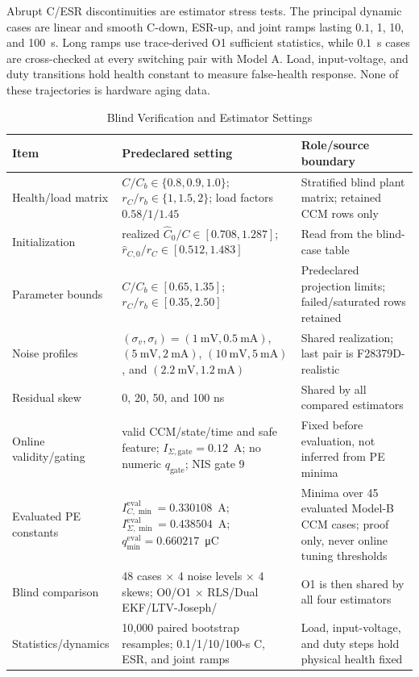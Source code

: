 Abrupt C/ESR discontinuities are estimator stress tests. The principal dynamic cases are linear and smooth C-down, ESR-up, and joint ramps lasting $0.1$, 1, 10, and 100~s. Long ramps use trace-derived O1 sufficient statistics, while $0.1$~s cases are cross-checked at every switching pair with Model A. Load, input-voltage, and duty transitions hold health constant to measure false-health response. None of these trajectories is hardware aging data.

\begin{table}[t]
\caption{Blind Verification and Estimator Settings}
\label{tab:verification_settings}
\centering
\footnotesize
\setlength{\tabcolsep}{4pt}
\begin{tabular}{p{3.0cm}p{6.0cm}p{6.6cm}}
\toprule
Item & Predeclared setting & Role/source boundary \\
\midrule
Health/load matrix & $C/C_b\in\{0.8,0.9,1.0\}$; $r_C/r_b\in\{1,1.5,2\}$; load factors $0.58/1/1.45$ & Stratified blind plant matrix; retained CCM rows only \\
Initialization & realized $\hat C_0/C\in[0.708,1.287]$; $\hat r_{C,0}/r_C\in[0.512,1.483]$ & Read from the blind-case table \\
Parameter bounds & $C/C_b\in[0.65,1.35]$; $r_C/r_b\in[0.35,2.50]$ & Predeclared projection limits; failed/saturated rows retained \\
Noise profiles & $(\sigma_v,\sigma_i)=(1~\mathrm{mV},0.5~\mathrm{mA})$, $(5~\mathrm{mV},2~\mathrm{mA})$, $(10~\mathrm{mV},5~\mathrm{mA})$, and $(2.2~\mathrm{mV},1.2~\mathrm{mA})$ & Shared realization; last pair is F28379D-realistic \\
Residual skew & 0, 20, 50, and 100 ns & Shared by all compared estimators \\
Online validity/gating & valid CCM/state/time and safe feature; $I_{\Sigma,\mathrm{gate}}=0.12$~A; no numeric $q_{\mathrm{gate}}$; \TSKF{} NIS gate 9 & Fixed before evaluation, not inferred from PE minima \\
Evaluated PE constants & $I_{C,\min}^{\mathrm{eval}}=0.330108$~A; $I_{\Sigma,\min}^{\mathrm{eval}}=0.438504$~A; $q_{\min}^{\mathrm{eval}}=0.660217$~\si{\micro\coulomb} & Minima over 45 evaluated Model-B CCM cases; proof only, never online tuning thresholds \\
Blind comparison & 48 cases $\times$ 4 noise levels $\times$ 4 skews; O0/O1 $\times$ RLS/Dual EKF/LTV-Joseph/\TSSRKE{} & O1 is then shared by all four estimators \\
Statistics/dynamics & 10,000 paired bootstrap resamples; 0.1/1/10/100-s C, ESR, and joint ramps & Load, input-voltage, and duty steps hold physical health fixed \\

\end{tabular}
\end{table}
